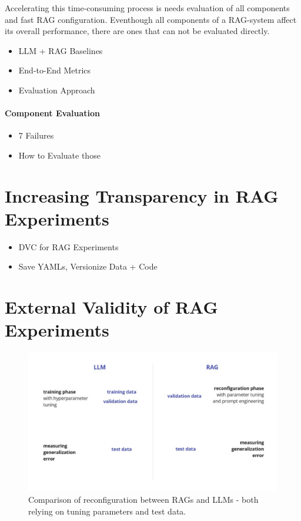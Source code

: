 Accelerating this time-consuming process is needs evaluation of all components and fast RAG configuration.\cite{Ru.15.08.2024.} Eventhough all components of a RAG-system affect its overall performance, there are ones that can not be evaluated directly.  \\
\begin{itemize}
    \item LLM + RAG Baselines
    \item End-to-End Metrics
    \item Evaluation Approach
\end{itemize}


\paragraph{Component Evaluation}

\begin{itemize}
    \item 7 Failures
    \item How to Evaluate those
\end{itemize}

\section{Increasing Transparency in RAG Experiments}

\begin{itemize}
    \item DVC for RAG Experiments
    \item Save YAMLs, Versionize Data + Code
\end{itemize}

\section{External Validity of RAG Experiments}

\begin{figure}
    \centering
    \includegraphics[width=\textwidth]{images/RAGvsLLM-tuning.pdf}
    \caption{Comparison of reconfiguration between RAGs and LLMs - both relying on tuning parameters and test data.}
    \label{fig:tuning}
\end{figure}


